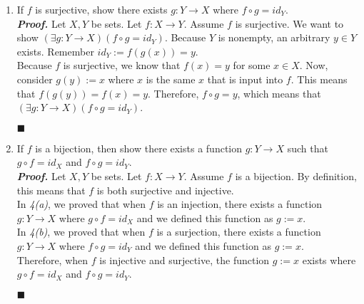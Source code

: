 \documentclass[11pt,a4paper]{article}
\begin{document}
\begin{enumerate}
\begin{enumerate}
        \item 
        If $f$ is surjective, show there exists $g: Y \rightarrow X $ where $f \circ g = id_Y $. \\
        \emph{\textbf{Proof.}} Let $X, Y$ be sets. Let $f: X \rightarrow Y $. Assume $f$ is surjective. 
        We want to show $(\exists g: Y \rightarrow X)(f \circ g = id_Y) $. Because $Y$ is nonempty, an arbitrary $y \in Y$ exists.
        Remember $id_Y := f(g(x)) = y $. \\
        Because $f$ is surjective, we know that $f(x) = y $ for some $x \in X$. Now, consider $g(y) := x $ where $x$ is the same $x$ that is input into $f$.
        This means that $f(g(y)) = f(x) = y $. 
        Therefore, $f \circ g = y $, which means that $(\exists g: Y \rightarrow X)(f \circ g = id_Y) $.
        \begin{flushright}
            $\blacksquare$
        \end{flushright}
        
        \item 
        If $f$ is a bijection, then show there exists a function $g: Y \rightarrow X  $
        such that $g \circ f = id_X $ and $f \circ g = id_Y $. \\
        \emph{\textbf{Proof.}} Let $X, Y$ be sets. Let $f: X \rightarrow Y $. Assume $f$ is a bijection. 
        By definition, this means that $f$ is both surjective and injective. \\
        In \emph{4(a)}, we proved that when $f$ is an injection, there exists a function $g: Y \rightarrow X$ where $g \circ f = id_X $ and we defined this function as $g := x $. \\
        In \emph{4(b)}, we proved that when $f$ is a surjection, there exists a function $g: Y \rightarrow X $ where $f \circ g = id_Y $ and we defined this function as $g := x $. \\
        Therefore, when $f$ is injective and surjective, the function $g := x $ exists where $g \circ f = id_X $ and $f \circ g = id_Y $.
        \begin{flushright}
            $\blacksquare$
        \end{flushright}

    \end{enumerate}
    \newpage


\end{enumerate}
\end{document}
